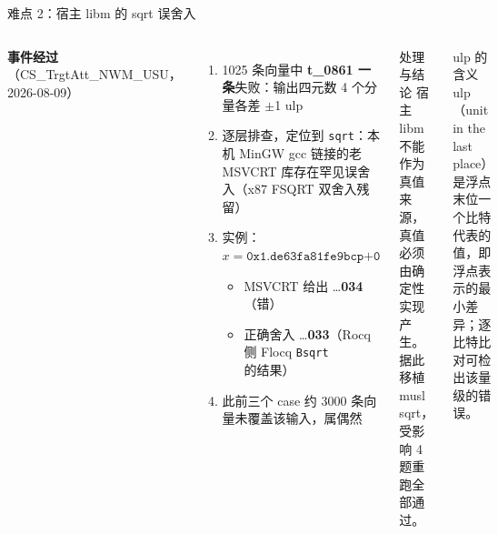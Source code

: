 \documentclass[UTF8,aspectratio=169]{ctexbeamer}
\begin{document}
\begin{frame}{难点 2：宿主 libm 的 sqrt 误舍入}
  \begin{columns}[T]
    \textbf{事件经过}（CS\_TrgtAtt\_NWM\_USU，2026-08-09）
    \begin{enumerate}\small
      \item 1025 条向量中 \textbf{t\_0861 一条}失败：输出四元数 4 个分量各差 $\pm$1 ulp
      \item 逐层排查，定位到 \texttt{sqrt}：本机 MinGW gcc 链接的老 MSVCRT 库存在罕见误舍入（x87 FSQRT 双舍入残留）
      \item 实例：$x = \texttt{0x1.de63fa81fe9bcp+0}$
        \begin{itemize}\footnotesize
          \item MSVCRT 给出 \ldots\textbf{034}（错）
          \item 正确舍入 \ldots\textbf{033}（Rocq 侧 Flocq \texttt{Bsqrt} 的结果）
        \end{itemize}
      \item 此前三个 case 约 3000 条向量未覆盖该输入，属偶然
    \end{enumerate}
    \begin{block}{处理与结论}
      \small 宿主 libm 不能作为真值来源，真值必须由确定性实现产生。据此移植 musl sqrt，受影响 4 题重跑全部通过。
    \end{block}
    \begin{block}{ulp 的含义}
      \small ulp（unit in the last place）是浮点末位一个比特代表的值，即浮点表示的最小差异；逐比特比对可检出该量级的错误。
    \end{block}
  \end{columns}
\end{frame}
\end{document}
